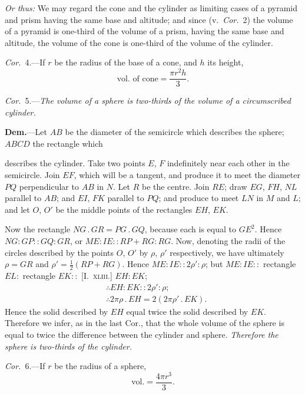 \documentclass[oneside]{book}
\newcommand\imgcent[2]{
\begin{center}

\end{center}
}
\begin{document}
\begin{footnotesize}
\emph{Or thus:} We may regard the cone and the cylinder as limiting
cases of a pyramid and prism having the same base and altitude;
and since (v.\ \emph{Cor.}~2) the volume of a pyramid is one-third of the
volume of a prism, having the same base and altitude, the volume
of the cone is one-third of the volume of the cylinder.
\par\end{footnotesize}

\emph{Cor.}~4.---If $r$ be the radius of the base of a cone, and
$h$ its height,
\[
\text{vol.\ of cone} = \frac{ \pi r^2 h }{3}.
\]

\emph{Cor.}~5.---\textit{The volume of a sphere is two-thirds of the
volume of a circumscribed cylinder.}


\imgcent{200}{f247}

\textbf{Dem.}---Let $AB$ be the diameter of the semicircle
which describes the sphere; $ABCD$ the rectangle which

describes the cylinder. Take two points $E$, $F$ indefinitely
near each other in the semicircle. Join $EF$, which
will be a tangent, and produce it to meet the diameter
$PQ$ perpendicular to $AB$ in $N$. Let $R$ be the centre.
Join $RE$; draw $EG$, $FH$, $NL$ parallel to $AB$; and $EI$,
$FK$ parallel to $PQ$; and produce to meet $LN$ in $M$ and
$L$; and let $O$, $O'$ be the middle points of the rectangles
$EH$, $EK$.

Now the rectangle $NG\,.\,GR = PG\,.\,GQ$, because each
is equal to $GE^{2}$. Hence $NG : GP :: GQ : GR$, or
$ME : IE :: RP+RG : RG$. Now, denoting the radii of
the circles described by the points $O$, $O'$ by $\rho$, $\rho'$ respectively,
we have ultimately $\rho = GR$ and $\rho' =\frac{1}{2}(RP + RG)$.
Hence $ME : IE :: 2\rho' : \rho$; but $ME : IE ::$ rectangle
$EL:$ rectangle $EK ::$ [I.~\textsc{xliii.}] $EH : EK$;
\begin{align*}
&  \therefore EH : EK :: 2\rho' : \rho;  \\
&  \therefore 2\pi\rho \,.\,EH = 2(2\pi\rho' \,.\,EK).
\end{align*}
Hence the solid described by $EH$ equal twice the solid
described by $EK$. Therefore we infer, as in the last
Cor., that the whole volume of the sphere is equal to
twice the difference between the cylinder and sphere.
\emph{Therefore the sphere is two-thirds of the cylinder.}

\emph{Cor.}~6.---If $r$ be the radius of a sphere,
\[
\text{vol.} = \frac{4\pi r^3 }{3}.
\]
\end{document}
